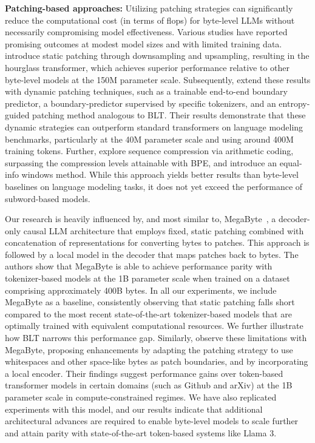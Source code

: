 \textbf{Patching-based approaches:} Utilizing patching strategies can significantly reduce the computational cost (in terms of flops) for byte-level LLMs without necessarily compromising model effectiveness. Various studies have reported promising outcomes at modest model sizes and with limited training data. \cite{nawrot-etal-2022-hierarchical} introduce static patching through downsampling and upsampling, resulting in the hourglass transformer, which achieves superior performance relative to other byte-level models at the 150M parameter scale. Subsequently, \cite{nawrot-etal-2023-efficient} extend these results with dynamic patching techniques, such as a trainable end-to-end boundary predictor, a boundary-predictor supervised by specific tokenizers, and an entropy-guided patching method analogous to {\textsc BLT}. Their results demonstrate that these dynamic strategies can outperform standard transformers on language modeling benchmarks, particularly at the 40M parameter scale and using around 400M training tokens. Further, \cite{lester2024training} explore sequence compression via arithmetic coding, surpassing the compression levels attainable with BPE, and introduce an equal-info windows method. While this approach yields better results than byte-level baselines on language modeling tasks, it does not yet exceed the performance of subword-based models.

Our research is heavily influenced by, and most similar to, MegaByte~\citep{yu2023megabyte}, a decoder-only causal LLM architecture that employs fixed, static patching combined with concatenation of representations for converting bytes to patches. This approach is followed by a local model in the decoder that maps patches back to bytes. The authors show that MegaByte is able to achieve performance parity with tokenizer-based models at the 1B parameter scale when trained on a dataset comprising approximately 400B bytes. In all our experiments, we include MegaByte as a baseline, consistently observing that static patching falls short compared to the most recent state-of-the-art tokenizer-based models that are optimally trained with equivalent computational resources. We further illustrate how {\textsc BLT} narrows this performance gap. Similarly, \cite{slagle2024spacebyte} observe these limitations with MegaByte, proposing enhancements by adapting the patching strategy to use whitespaces and other space-like bytes as patch boundaries, and by incorporating a local encoder. Their findings suggest performance gains over token-based transformer models in certain domains (such as Github and arXiv) at the 1B parameter scale in compute-constrained regimes. We have also replicated experiments with this model, and our results indicate that additional architectural advances are required to enable byte-level models to scale further and attain parity with state-of-the-art token-based systems like Llama 3.


